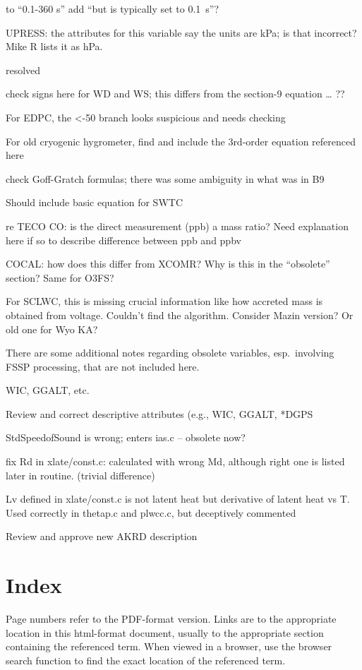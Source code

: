 \documentclass[
  english,
]{book}
\begin{document}
to ``0.1-360 s'' add ``but is typically set to 0.1~s''?

UPRESS: the attributes for this variable say the units are kPa; is that
incorrect? Mike R lists it as hPa.

resolved

check signs here for WD and WS; this differs from the section-9 equation
\ldots{} ??

For EDPC, the \textless-50 branch looks suspicious and needs checking

For old cryogenic hygrometer, find and include the 3rd-order equation
referenced here

check Goff-Gratch formulas; there was some ambiguity in what was in B9

Should include basic equation for SWTC

re TECO CO: is the direct measurement (ppb) a mass ratio? Need
explanation here if so to describe difference between ppb and ppbv

COCAL: how does this differ from XCOMR? Why is this in the ``obsolete''
section? Same for O3FS?

For SCLWC, this is missing crucial information like how accreted mass is
obtained from voltage. Couldn't find the algorithm. Consider Mazin
version? Or old one for Wyo KA?

There are some additional notes regarding obsolete variables,
esp.~involving FSSP processing, that are not included here.

WIC, GGALT, etc.

Review and correct descriptive attributes (e.g., WIC, GGALT, *DGPS

StdSpeedofSound is wrong; enters ias.c -- obsolete now?

fix Rd in xlate/const.c: calculated with wrong Md, although right one is
listed later in routine. (trivial difference)

Lv defined in xlate/const.c is not latent heat but derivative of latent
heat vs T. Used correctly in thetap.c and plwcc.c, but deceptively
commented

Review and approve new AKRD description

\hypertarget{index-1}{%
\chapter{Index}\label{index-1}}

Page numbers refer to the PDF-format version. Links are to the
appropriate location in this html-format document, usually to the
appropriate section containing the referenced term. When viewed in a
browser, use the browser search function to find the exact location of
the referenced term. \twocolumn
\end{document}
